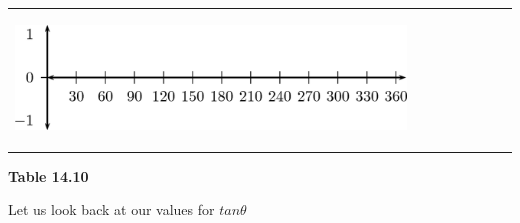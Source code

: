 \begin{center}
\begin{xtabular*}{\mytablewidth}[t]{|p{10\mystarwidth}|p{10\mystarwidth}|p{10\mystarwidth}|p{10\mystarwidth}|p{10\mystarwidth}|p{10\mystarwidth}|p{10\mystarwidth}|p{10\mystarwidth}|}
{\begin{center}
\label{m39414*id89550!!!underscore!!!media}\label{m39414*id89550!!!underscore!!!printimage}\includegraphics{col11306.imgs/m39414_MG10C15_031.png} %
\vspace{2pt}
\vspace{.1in}
\end{center}    
  }
\tabularnewline{}
\end{xtabular*}
\end{center}
\begin{center}{\small\bfseries Table 14.10}\end{center}
\par
\label{m39414*id89576}Let us look back at our values for $tan\theta $\par 
